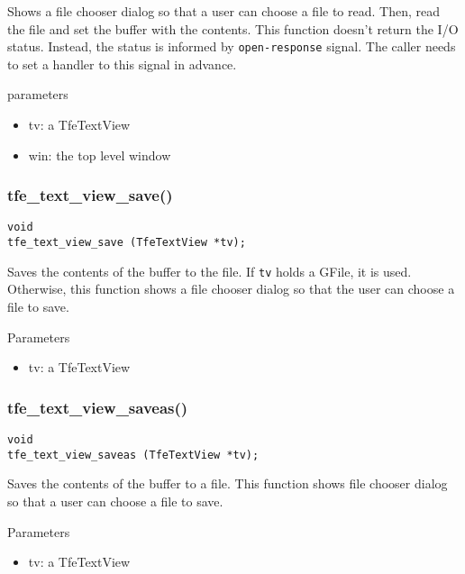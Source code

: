 Shows a file chooser dialog so that a user can choose a file to read.
Then, read the file and set the buffer with the contents. This function
doesn't return the I/O status. Instead, the status is informed by
\passthrough{\lstinline!open-response!} signal. The caller needs to set
a handler to this signal in advance.

parameters

\begin{itemize}
\tightlist
\item
  tv: a TfeTextView
\item
  win: the top level window
\end{itemize}

\subsubsection{tfe\_text\_view\_save()}\label{tfe_text_view_save}

\begin{lstlisting}
void
tfe_text_view_save (TfeTextView *tv);
\end{lstlisting}

Saves the contents of the buffer to the file. If
\passthrough{\lstinline!tv!} holds a GFile, it is used. Otherwise, this
function shows a file chooser dialog so that the user can choose a file
to save.

Parameters

\begin{itemize}
\tightlist
\item
  tv: a TfeTextView
\end{itemize}

\subsubsection{tfe\_text\_view\_saveas()}\label{tfe_text_view_saveas}

\begin{lstlisting}
void
tfe_text_view_saveas (TfeTextView *tv);
\end{lstlisting}

Saves the contents of the buffer to a file. This function shows file
chooser dialog so that a user can choose a file to save.

Parameters

\begin{itemize}
\tightlist
\item
  tv: a TfeTextView
\end{itemize}

